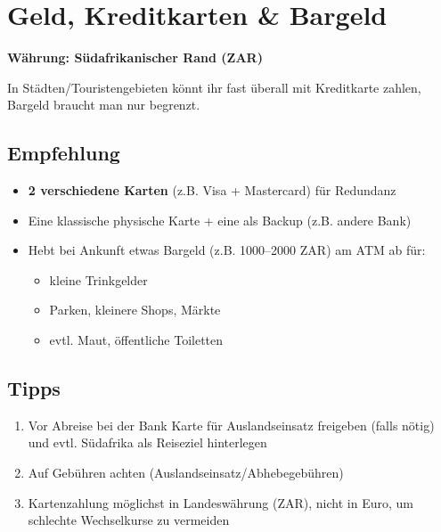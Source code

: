 \documentclass[12pt,a4paper]{article}
\begin{document}
\section{Geld, Kreditkarten \& Bargeld}

\begin{actionbox}
\centering
{\Large\color{accentorange}\sffamily\bfseries \faMoneyBillWave\;\; Währung: Südafrikanischer Rand (ZAR)}
\end{actionbox}

\vspace{0.3cm}

In Städten/Touristengebieten könnt ihr fast überall mit Kreditkarte zahlen, Bargeld braucht man nur begrenzt.\cite{airalo}

\subsection{Empfehlung}

\begin{itemize}[leftmargin=*,label={\color{darkgreen}\faCreditCard}]
    \item \textbf{2 verschiedene Karten} (z.B. Visa + Mastercard) für Redundanz
    \item Eine klassische physische Karte + eine als Backup (z.B. andere Bank)
    \item Hebt bei Ankunft etwas Bargeld (z.B. 1000–2000 ZAR) am ATM ab für:
    \begin{itemize}[label={\color{accentorange}\faCoins}]
        \item kleine Trinkgelder
        \item Parken, kleinere Shops, Märkte
        \item evtl. Maut, öffentliche Toiletten
    \end{itemize}
\end{itemize}

\subsection{Tipps}

\begin{enumerate}[leftmargin=*,label={\color{mainblue}\bfseries\arabic*.}]
    \item Vor Abreise bei der Bank Karte für Auslandseinsatz freigeben (falls nötig) und evtl. Südafrika als Reiseziel hinterlegen
    \item Auf Gebühren achten (Auslandseinsatz/Abhebegebühren)
    \item Kartenzahlung möglichst in Landeswährung (ZAR), nicht in Euro, um schlechte Wechselkurse zu vermeiden
\end{enumerate}
\end{document}

